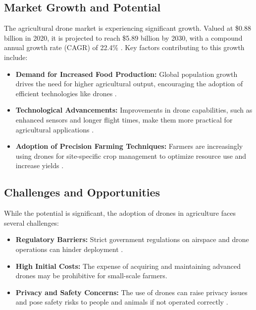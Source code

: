 \subsection{Market Growth and Potential}

The agricultural drone market is experiencing significant growth. Valued at \$0.88 billion in 2020, it is projected to reach \$5.89 billion by 2030, with a compound annual growth rate (CAGR) of 22.4\% \citep{alliedmarketresearch2021}. Key factors contributing to this growth include:

\begin{itemize} 
	\item \textbf{Demand for Increased Food Production:} Global population growth drives the need for higher agricultural output, encouraging the adoption of efficient technologies like drones \citep{nazarov2023}. 
	\item \textbf{Technological Advancements:} Improvements in drone capabilities, such as enhanced sensors and longer flight times, make them more practical for agricultural applications \citep{guardianagriculture}. 
	\item \textbf{Adoption of Precision Farming Techniques:} Farmers are increasingly using drones for site-specific crop management to optimize resource use and increase yields \citep{alliedmarketresearch2021}. 
\end{itemize}

\subsection{Challenges and Opportunities}

While the potential is significant, the adoption of drones in agriculture faces several challenges:

\begin{itemize} 
	\item \textbf{Regulatory Barriers:} Strict government regulations on airspace and drone operations can hinder deployment \citep{nazarov2023}. 
	\item \textbf{High Initial Costs:} The expense of acquiring and maintaining advanced drones may be prohibitive for small-scale farmers. %
	\item \textbf{Privacy and Safety Concerns:} The use of drones can raise privacy issues and pose safety risks to people and animals if not operated correctly \citep{petiole_drones_risks}. 
\end{itemize}

